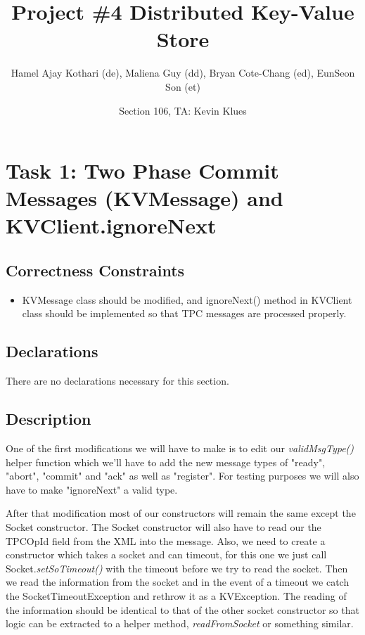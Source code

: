 \documentclass{article}
\begin{document}
\title{Project \#4 Distributed Key-Value Store} 
\author{Hamel Ajay Kothari (de), Maliena Guy (dd), Bryan Cote-Chang (ed), EunSeon Son (et)}
\date{Section 106, TA: Kevin Klues}
\maketitle

\section*{Task 1: Two Phase Commit Messages (KVMessage) and KVClient.ignoreNext}
\subsection*{Correctness Constraints}
\begin{itemize}
\item KVMessage class should be modified, and ignoreNext() method in KVClient class should be implemented so that TPC
messages are processed properly.
\end{itemize}

\subsection*{Declarations}
There are no declarations necessary for this section.

\subsection*{Description}

One of the first modifications we will have to make is to edit our \textit{validMsgType()} helper function which we'll
have to add the new message types of "ready", "abort", "commit" and "ack" as well as "register". For testing purposes we
will also have to make "ignoreNext" a valid type.

After that modification most of our constructors will remain the same except the Socket constructor. The Socket
constructor will also have to read our the TPCOpId field from the XML into the message. Also, we need to create a
constructor which takes a socket and can timeout, for this one we just call Socket.\textit{setSoTimeout()} with the
timeout before we try to read the socket. Then we read the information from the socket and in the event of a timeout we
catch the SocketTimeoutException and rethrow it as a KVException. The reading of the information should be identical to
that of the other socket constructor so that logic can be extracted to a helper method, \textit{readFromSocket} or
something similar.
\end{document}
